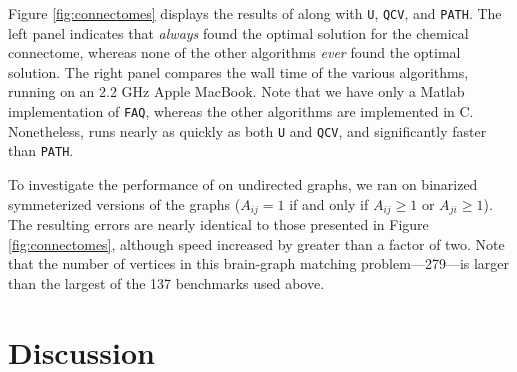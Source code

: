 \documentclass[11pt]{article}
\begin{document}
Figure \ref{fig:connectomes} displays the results of \FAQ along with \texttt{U}, \texttt{QCV},  and \texttt{PATH}.  The left panel indicates that \FAQ \emph{always} found the optimal solution for the chemical connectome, whereas none of the other algorithms \emph{ever} found the optimal solution.  The right panel compares the wall time of the various algorithms, running on an 2.2 GHz Apple MacBook. Note that we have only a Matlab implementation of \texttt{FAQ}, whereas the other algorithms are implemented in C.  Nonetheless, \FAQ runs nearly as quickly as both \texttt{U} and \texttt{QCV}, and significantly faster than \texttt{PATH}.  %



To investigate the performance of \FAQ on undirected graphs, we ran \FAQ on binarized symmeterized versions of the graphs ($A_{ij}=1$ if and only if $A_{ij}\geq 1$ or $A_{ji} \geq 1$).  The resulting errors are nearly identical to those presented in Figure \ref{fig:connectomes}, although speed increased by greater than a factor of two. Note that the number of vertices in this brain-graph matching problem---279---is larger than the largest of the 137 benchmarks used above. 




\section{Discussion}
\label{sec:discussion}
\end{document}
